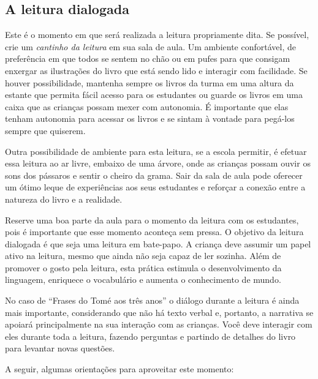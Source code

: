 \documentclass[11pt]{extarticle}
\begin{document}
\subsection{A leitura dialogada}
Este é o momento em que será realizada a leitura propriamente dita. 
Se possível, crie um \textit{cantinho da leitura} em sua sala de aula. Um 
ambiente confortável, de preferência em que todos se sentem no chão ou 
em pufes para que consigam enxergar as ilustrações do livro que está 
sendo lido e interagir com facilidade. Se houver possibilidade, mantenha 
sempre os livros da turma em uma altura da estante que permita fácil 
acesso para os estudantes ou guarde os livros em uma caixa que as crianças 
possam mexer com autonomia. É importante que elas tenham autonomia para 
acessar os livros e se sintam à vontade para pegá-los sempre que quiserem. 


Outra possibilidade de ambiente para esta leitura, se a escola permitir, 
é efetuar essa leitura ao ar livre, embaixo de uma árvore, onde as crianças 
possam ouvir os sons dos pássaros e sentir o cheiro da grama. Sair da sala 
de aula pode oferecer um ótimo leque de experiências aos seus estudantes e 
reforçar a conexão entre a natureza do livro e a realidade.  

Reserve uma boa parte da aula para o momento da leitura com os estudantes, 
pois é importante que esse momento aconteça sem pressa. O objetivo da 
leitura dialogada é que seja uma leitura em bate-papo. A criança deve 
assumir um papel ativo na leitura, mesmo que ainda não seja capaz de 
ler sozinha. Além de promover o gosto pela leitura, esta prática estimula 
o desenvolvimento da linguagem, enriquece o vocabulário e 
aumenta o conhecimento de mundo.

No caso de “Frases do Tomé aos três anos” o diálogo durante a leitura é 
ainda mais importante, considerando que não há texto verbal e, 
portanto, a narrativa se apoiará principalmente na sua interação com as crianças. 
Você deve interagir com eles durante toda a 
leitura, fazendo perguntas e partindo de detalhes do livro para 
levantar novas questões. 

A seguir, algumas orientações para aproveitar este momento: 
\end{document}
